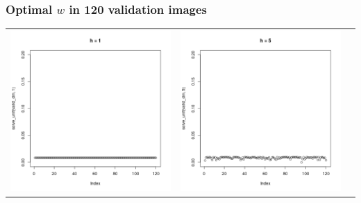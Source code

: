 \documentclass{beamer}
\begin{document}
\begin{frame}
\frametitle{Optimal $w$ in 120 validation images}
\begin{tabular}{ccc}
\includegraphics[scale=0.2]{valid_weight1.png} &
\includegraphics[scale=0.2]{valid_weight5.png} &

\end{tabular}
\end{frame}
\end{document}
